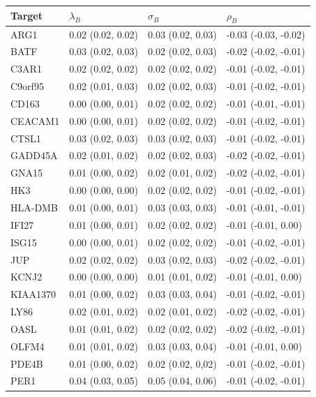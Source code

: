 \documentclass[../thesis.tex]{subfiles}
\begin{document}
\begin{table}[!t]
\centering
 {\begin{tabular}{|l|lll|}
\hline
Target &  $\lambda_B$ & $\sigma_B$ & $\rho_B$  \\
\hline
ARG1 & 0.02 (0.02, 0.02) & 0.03 (0.02, 0.03) & -0.03 (-0.03, -0.02) \\
BATF & 0.03 (0.02, 0.03) & 0.02 (0.02, 0.03) & -0.02 (-0.02, -0.01) \\
C3AR1 & 0.02 (0.02, 0.02) & 0.02 (0.02, 0.02) & -0.01 (-0.02, -0.01) \\ 
C9orf95 & 0.02 (0.01, 0.03) & 0.02 (0.02, 0.03) & -0.01 (-0.02, -0.01) \\ 
CD163 & 0.00 (0.00, 0.01) & 0.02 (0.02, 0.02) & -0.01 (-0.01, -0.01) \\ 
CEACAM1 & 0.00 (0.00, 0.01) & 0.02 (0.02, 0.02) & -0.01 (-0.02, -0.01) \\ 
CTSL1 & 0.03 (0.02, 0.03) & 0.03 (0.02, 0.03) & -0.01 (-0.02, -0.01) \\ 
GADD45A & 0.02 (0.01, 0.02) & 0.02 (0.02, 0.03) & -0.02 (-0.02, -0.01) \\ 
GNA15 & 0.01 (0.00, 0.02) & 0.02 (0.01, 0.02) & -0.02 (-0.02, -0.01) \\ 
HK3 & 0.00  (0.00, 0.00) & 0.02 (0.02, 0.02) & -0.01 (-0.02, -0.01) \\ 
HLA-DMB & 0.01 (0.00, 0.01) & 0.03 (0.03, 0.03) & -0.01 (-0.01, -0.01) \\ 
IFI27 & 0.01 (0.00, 0.01) & 0.02 (0.02, 0.02) & -0.01 (-0.01, 0.00) \\ 
ISG15 & 0.00  (0.00, 0.01) & 0.02 (0.02, 0.02) & -0.01 (-0.02, -0.01) \\ 
JUP & 0.02 (0.02, 0.02) & 0.03 (0.02, 0.03) & -0.02 (-0.02, -0.01) \\ 
KCNJ2 & 0.00  (0.00, 0.00) & 0.01 (0.01, 0.02) & -0.01 (-0.01, 0.00) \\ 
KIAA1370 & 0.01 (0.00, 0.02) & 0.03 (0.03, 0.04) & -0.01 (-0.02, -0.01) \\ 
LY86 & 0.02 (0.01, 0.02) & 0.02 (0.01, 0.02) & -0.02 (-0.02, -0.01) \\ 
OASL & 0.01 (0.01, 0.02) & 0.02 (0.02, 0.02) & -0.02 (-0.02, -0.01) \\ 
OLFM4 & 0.01 (0.01, 0.02) & 0.03 (0.03, 0.04) & -0.01 (-0.01, 0.00) \\ 
PDE4B & 0.01 (0.00, 0.02) & 0.02 (0.02, 0,02) & -0.01 (-0.02, -0.01) \\ 
PER1 & 0.04 (0.03, 0.05) & 0.05 (0.04, 0.06) & -0.01 (-0.02, -0.01) \\ 

\end{tabular}}
\end{table}
\end{document}
